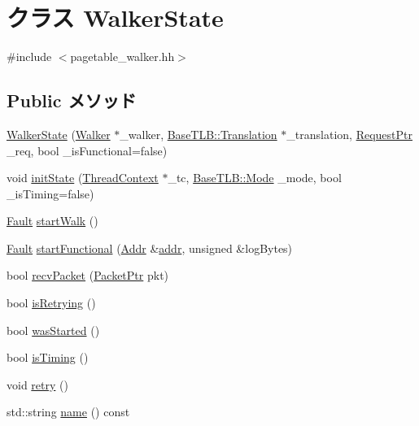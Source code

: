 \hypertarget{classX86ISA_1_1Walker_1_1WalkerState}{
\section{クラス WalkerState}
\label{classX86ISA_1_1Walker_1_1WalkerState}
}


{\ttfamily \#include $<$pagetable\_\-walker.hh$>$}\subsection*{Public メソッド}
\begin{DoxyCompactItemize}
\item 
\hyperlink{classX86ISA_1_1Walker_1_1WalkerState_ac84e175444e79eb369ed3d6debdb601f}{WalkerState} (\hyperlink{classX86ISA_1_1Walker}{Walker} $\ast$\_\-walker, \hyperlink{classBaseTLB_1_1Translation}{BaseTLB::Translation} $\ast$\_\-translation, \hyperlink{classRequest}{RequestPtr} \_\-req, bool \_\-isFunctional=false)
\item 
void \hyperlink{classX86ISA_1_1Walker_1_1WalkerState_a92aeb88528be9893c2e8fe61629fc942}{initState} (\hyperlink{classThreadContext}{ThreadContext} $\ast$\_\-tc, \hyperlink{classBaseTLB_a46c8a310cf4c094f8c80e1cb8dc1f911}{BaseTLB::Mode} \_\-mode, bool \_\-isTiming=false)
\item 
\hyperlink{classRefCountingPtr}{Fault} \hyperlink{classX86ISA_1_1Walker_1_1WalkerState_abe41f563c4251c8a075c343d770369ac}{startWalk} ()
\item 
\hyperlink{classRefCountingPtr}{Fault} \hyperlink{classX86ISA_1_1Walker_1_1WalkerState_ac1af47bc545fc273626009cb651d3b39}{startFunctional} (\hyperlink{base_2types_8hh_af1bb03d6a4ee096394a6749f0a169232}{Addr} \&\hyperlink{namespaceX86ISA_ab705917f60c5566f9ce56a93f798b2e2}{addr}, unsigned \&logBytes)
\item 
bool \hyperlink{classX86ISA_1_1Walker_1_1WalkerState_ac6c4ea75aa4bd19a760aca940fad8876}{recvPacket} (\hyperlink{classPacket}{PacketPtr} pkt)
\item 
bool \hyperlink{classX86ISA_1_1Walker_1_1WalkerState_a46197e29b4fb481e9f1a932fbbf44586}{isRetrying} ()
\item 
bool \hyperlink{classX86ISA_1_1Walker_1_1WalkerState_a0335da57d5042e3a3dcfb9635cd3d1ca}{wasStarted} ()
\item 
bool \hyperlink{classX86ISA_1_1Walker_1_1WalkerState_a9dc00933e3ae5f8801363f2288084154}{isTiming} ()
\item 
void \hyperlink{classX86ISA_1_1Walker_1_1WalkerState_a549fc33ae3e5c345795b8384a91fb544}{retry} ()
\item 
std::string \hyperlink{classX86ISA_1_1Walker_1_1WalkerState_a37627d5d5bba7f4a8690c71c2ab3cb07}{name} () const 
\end{DoxyCompactItemize}
